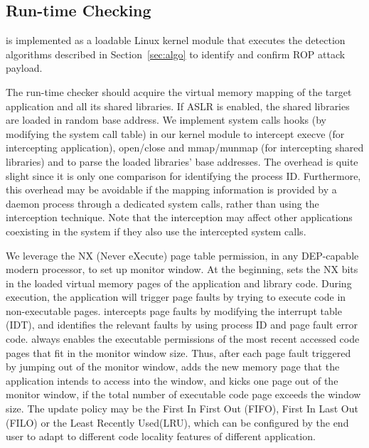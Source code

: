 \subsection{Run-time Checking} \label{sec:checker}
\name is implemented as a loadable Linux kernel module
that executes the detection algorithms described in
Section~\ref{sec:algo} to identify and confirm ROP attack payload.

The run-time checker should acquire the virtual memory mapping of the target
application and all its shared libraries. If ASLR is enabled,
the shared libraries are loaded in random base address. We implement
system calls hooks (by modifying the system call table) in our kernel module to intercept execve (for intercepting application), open/close and
mmap/munmap (for intercepting shared libraries) and to parse the loaded libraries' base addresses. The overhead is quite slight since it is only one comparison for identifying the process ID. Furthermore, this overhead may be avoidable
if the mapping information is provided by a daemon process through a dedicated system calls,
rather than using the interception technique.
Note that the interception may affect
other applications coexisting in the system if they also use the intercepted system calls.


We leverage the NX (Never eXecute) page table permission, in any DEP-capable modern processor,
to set up monitor window. At the beginning, \name sets the NX bits in the loaded virtual memory
pages of the application and library code.
During execution, the application will trigger page
faults by trying to execute code in non-executable pages. \name intercepts
page faults by modifying the interrupt table (IDT), and identifies the relevant
faults by using process ID and page fault error code.
\name always enables the executable permissions of the most recent accessed code
pages that fit in the monitor window size. Thus, after each page fault triggered by
jumping out of the monitor window, \name adds the new memory page that the application
intends to access into the window, and kicks one page out of the monitor window, if the total
number of executable code page exceeds the window size.
The update policy may be the First In First Out (FIFO), First In Last Out (FILO)
or the Least Recently Used(LRU), which can be configured by the end user to adapt to
different code locality features of different application.

